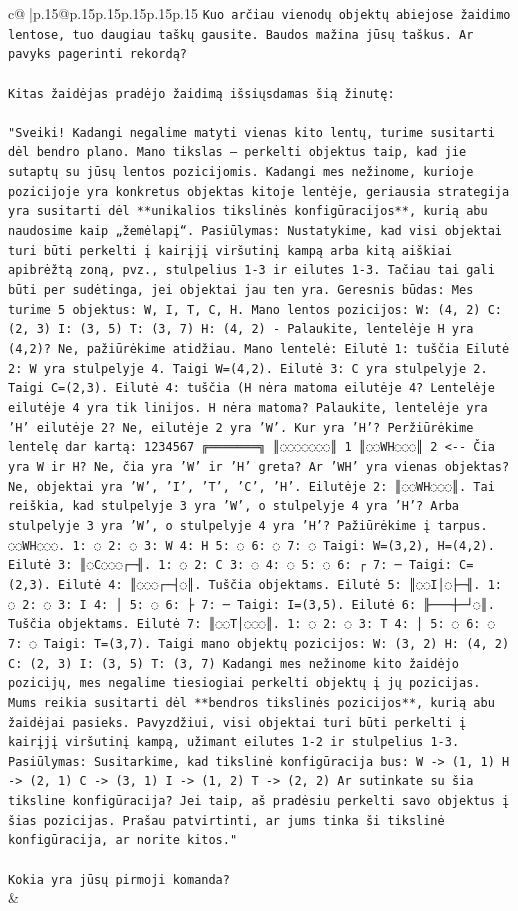 \documentclass{article}
\begin{document}
{\begin{supertabular}{c@{$\;$}|p{.15\linewidth}@{}p{.15\linewidth}p{.15\linewidth}p{.15\linewidth}p{.15\linewidth}p{.15\linewidth}}
{{{\texttt{Kuo arčiau vienodų objektų abiejose žaidimo lentose, tuo daugiau taškų gausite. Baudos mažina jūsų taškus. Ar pavyks pagerinti rekordą?} \\
\\ 
\texttt{Kitas žaidėjas pradėjo žaidimą išsiųsdamas šią žinutę:} \\
\\ 
\texttt{"Sveiki! Kadangi negalime matyti vienas kito lentų, turime susitarti dėl bendro plano. Mano tikslas – perkelti objektus taip, kad jie sutaptų su jūsų lentos pozicijomis. Kadangi mes nežinome, kurioje pozicijoje yra konkretus objektas kitoje lentėje, geriausia strategija yra susitarti dėl **unikalios tikslinės konfigūracijos**, kurią abu naudosime kaip „žemėlapį“. Pasiūlymas: Nustatykime, kad visi objektai turi būti perkelti į kairįjį viršutinį kampą arba kitą aiškiai apibrėžtą zoną, pvz., stulpelius 1{-}3 ir eilutes 1{-}3. Tačiau tai gali būti per sudėtinga, jei objektai jau ten yra. Geresnis būdas: Mes turime 5 objektus: W, I, T, C, H. Mano lentos pozicijos: W: (4, 2) C: (2, 3) I: (3, 5) T: (3, 7) H: (4, 2) {-} Palaukite, lentelėje H yra (4,2)? Ne, pažiūrėkime atidžiau. Mano lentelė: Eilutė 1: tuščia Eilutė 2: W yra stulpelyje 4. Taigi W=(4,2). Eilutė 3: C yra stulpelyje 2. Taigi C=(2,3). Eilutė 4: tuščia (H nėra matoma eilutėje 4? Lentelėje eilutėje 4 yra tik linijos. H nėra matoma? Palaukite, lentelėje yra 'H' eilutėje 2? Ne, eilutėje 2 yra 'W'. Kur yra 'H'? Peržiūrėkime lentelę dar kartą: 1234567 ╔═══════╗ ║◌◌◌◌◌◌◌║ 1 ║◌◌WH◌◌◌║ 2 <{-}{-} Čia yra W ir H? Ne, čia yra 'W' ir 'H' greta? Ar 'WH' yra vienas objektas? Ne, objektai yra 'W', 'I', 'T', 'C', 'H'. Eilutėje 2: ║◌◌WH◌◌◌║. Tai reiškia, kad stulpelyje 3 yra 'W', o stulpelyje 4 yra 'H'? Arba stulpelyje 3 yra 'W', o stulpelyje 4 yra 'H'? Pažiūrėkime į tarpus. ◌◌WH◌◌◌. 1: ◌ 2: ◌ 3: W 4: H 5: ◌ 6: ◌ 7: ◌ Taigi: W=(3,2), H=(4,2). Eilutė 3: ║◌C◌◌◌┌─╢. 1: ◌ 2: C 3: ◌ 4: ◌ 5: ◌ 6: ┌ 7: ─ Taigi: C=(2,3). Eilutė 4: ║◌◌◌┌─┤◌║. Tuščia objektams. Eilutė 5: ║◌◌I│◌├─╢. 1: ◌ 2: ◌ 3: I 4: │ 5: ◌ 6: ├ 7: ─ Taigi: I=(3,5). Eilutė 6: ╟───┼─┘◌║. Tuščia objektams. Eilutė 7: ║◌◌T│◌◌◌║. 1: ◌ 2: ◌ 3: T 4: │ 5: ◌ 6: ◌ 7: ◌ Taigi: T=(3,7). Taigi mano objektų pozicijos: W: (3, 2) H: (4, 2) C: (2, 3) I: (3, 5) T: (3, 7) Kadangi mes nežinome kito žaidėjo pozicijų, mes negalime tiesiogiai perkelti objektų į jų pozicijas. Mums reikia susitarti dėl **bendros tikslinės pozicijos**, kurią abu žaidėjai pasieks. Pavyzdžiui, visi objektai turi būti perkelti į kairįjį viršutinį kampą, užimant eilutes 1{-}2 ir stulpelius 1{-}3. Pasiūlymas: Susitarkime, kad tikslinė konfigūracija bus: W {-}> (1, 1) H {-}> (2, 1) C {-}> (3, 1) I {-}> (1, 2) T {-}> (2, 2) Ar sutinkate su šia tiksline konfigūracija? Jei taip, aš pradėsiu perkelti savo objektus į šias pozicijas. Prašau patvirtinti, ar jums tinka ši tikslinė konfigūracija, ar norite kitos."} \\
\\ 
\texttt{Kokia yra jūsų pirmoji komanda?} \\
            }
        }
    }
    & \\ \\


\end{supertabular}}
\end{document}
